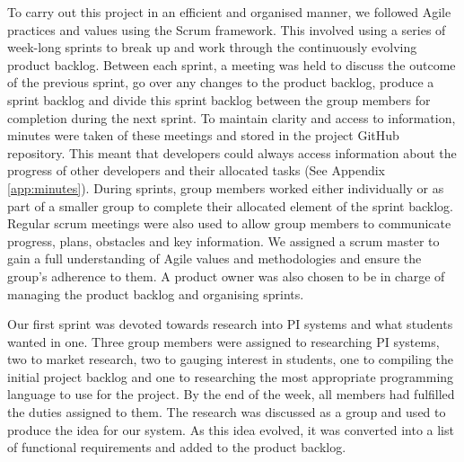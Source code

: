 \documentclass[11pt]{article}
\begin{document}
To carry out this project in an efficient and organised manner, we followed
Agile practices and values using the Scrum framework. This involved using a
series of week-long sprints to break up and work through the continuously
evolving product backlog. Between each sprint, a meeting was held to discuss
the outcome of the previous sprint, go over any changes to the product backlog,
produce a sprint backlog and divide this sprint backlog between the group
members for completion during the next sprint. To maintain clarity and access
to information, minutes were taken of these meetings and stored in the project
GitHub repository. This meant that developers could always access information
about the progress of other developers and their allocated tasks (See Appendix
\ref{app:minutes}). During sprints, group members worked either individually or
as part of a smaller group to complete their allocated element of the sprint
backlog. Regular scrum meetings were also used to allow group members to
communicate progress, plans, obstacles and key information. We assigned a scrum
master to gain a full understanding of Agile values and methodologies and
ensure the group's adherence to them. A product owner was also chosen to be in
charge of managing the product backlog and organising sprints.\par

Our first sprint was devoted towards research into PI systems and what students
wanted in one. Three group members were assigned to researching PI systems, two
to market research, two to gauging interest in students, one to compiling the
initial project backlog and one to researching the most appropriate programming
language to use for the project. By the end of the week, all members had
fulfilled the duties assigned to them. The research was discussed as a group
and used to produce the idea for our system. As this idea evolved, it was
converted into a list of functional requirements and added to the product
backlog.\par
\end{document}
